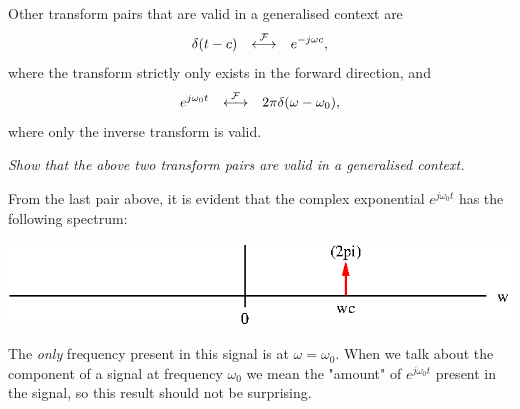 \documentclass[10pt]{beamer}
\newcommand{\ftpair}{{\stackrel{\cal F}{\longleftrightarrow}}}
\begin{document}
Other transform pairs that are valid in a generalised context are
\begin{equation*}
  \delta(t - c) \quad \ftpair \quad e^{-j \omega c},
\end{equation*}
where the transform strictly only exists in the forward direction, and
\begin{equation*}
  e^{j \omega_0 t} \quad \ftpair \quad 2 \pi \delta(\omega - \omega_0),
\end{equation*}
where only the inverse transform is valid.

{\em Show that the above two transform pairs are valid in a generalised context.}

From the last pair above, it is evident that the complex exponential $e^{j \omega_0 t}$ has the following spectrum:
\begin{center}
  \includegraphics{compexpspectrum}
\end{center}
The {\em only} frequency present in this signal is at $\omega = \omega_0$.   When we talk about the component of a signal at frequency $\omega_0$ we mean the "amount" of $e^{j \omega_0 t}$ present in the signal, so this result should not be surprising.
\end{document}
